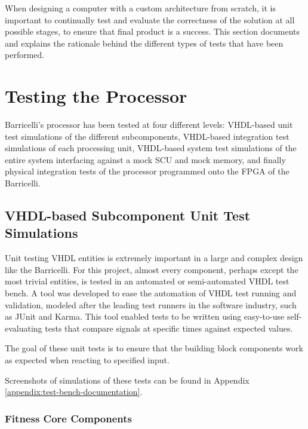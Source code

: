 When designing a computer with a custom architecture from scratch, it is important to continually test and evaluate the correctness of the solution at all possible stages, to ensure that final product is a success.
This section documents and explains the rationale behind the different types of tests that have been performed.

\section{Testing the Processor}

Barricelli's processor has been tested at four different levels: \gls{VHDL}-based unit test simulations of the different subcomponents,  \gls{VHDL}-based integration test simulations of each processing unit, \gls{VHDL}-based system test simulations of the entire system interfacing against a mock SCU and mock memory, and finally physical integration tests of the processor programmed onto the FPGA of the Barricelli.



\subsection{\gls{VHDL}-based Subcomponent Unit Test Simulations}

Unit testing VHDL entities is extremely important in a large and complex design like the Barricelli.
For this project, almost every component, perhaps except the most trivial entities, is tested in an automated or semi-automated VHDL test bench.
A tool was developed to ease the automation of VHDL test running and validation, modeled after the leading test runners in the software industry, such as JUnit\cite{junit} and Karma\cite{karma}.
This tool enabled tests to be written using easy-to-use self-evaluating tests that compare signals at specific times against expected values.

The goal of these unit tests is to ensure that the building block components work as expected when reacting to specified input.

Screenshots of simulations of these tests can be found in Appendix \ref{appendix:test-bench-documentation}.

\subsubsection{Fitness Core Components}





